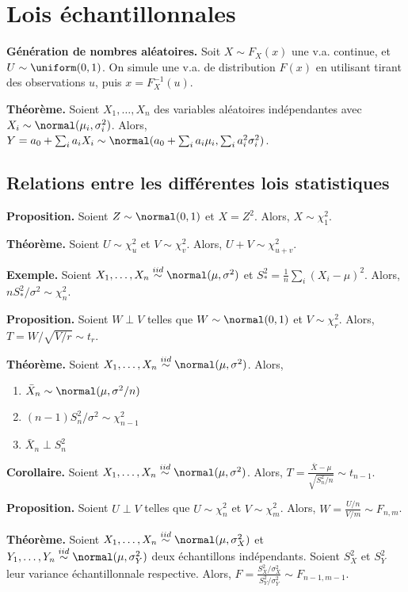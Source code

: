 \section{Lois échantillonnales}
\textbf{Génération de nombres aléatoires.} Soit $X \sim F_X(x)$ une v.a. continue, et $U \sim \uniform(0,1)$. On simule une v.a. de distribution $F(x)$ en utilisant tirant des observations $u$, puis $x=F_X^{-1}(u)$.


\textbf{Théorème.} Soient $X_1, \dots, X_n$ des variables aléatoires indépendantes avec $X_i \sim \normal(\mu_i,\sigma_i^2)$. Alors, $Y = a_0 + \sum_{i} a_iX_i \sim \normal(a_0 + \sum_i a_i\mu_i, \sum_i a_i^2\sigma_i^2)$.

\subsection{Relations entre les différentes lois statistiques}

\textbf{Proposition.} Soient $Z \sim \normal(0,1)$ et $X=Z^2$. Alors, $X \sim \chi^2_1$.

\textbf{Théorème.} Soient $U \sim \chi^2_u$ et $V \sim \chi^2_v$. Alors, $U+V \sim \chi^2_{u+v}$.

\textbf{Exemple.} Soient $X_1, \dots, X_n \overset{iid}{\sim} \normal(\mu, \sigma^2)$ et $S^2_* = \frac{1}{n}\sum_i(X_i-\mu)^2$. Alors, $nS^2_*/\sigma^2 \sim \chi^2_n$.

\textbf{Proposition.} Soient $W \perp V$ telles que $W \sim \normal(0,1)$ et $V \sim \chi^2_r$. Alors, $T=W/\sqrt{V/r} \sim t_r$.

\textbf{Théorème.} Soient $X_1,\dots, X_n \overset{iid}{\sim} \normal(\mu,\sigma^2)$. Alors,
\begin{enumerate}
	\item $\bar{X}_n \sim \normal(\mu, \sigma^2/n)$
	\item $(n-1)S^2_n/\sigma^2 \sim \chi^2_{n-1}$
	\item $\bar{X}_n \perp S^2_n$
\end{enumerate}

\textbf{Corollaire.} Soient $X_1,\dots, X_n \overset{iid}{\sim} \normal(\mu,\sigma^2)$. Alors, $T=\frac{\bar{X}-\mu}{\sqrt{S^2_n/n}} \sim t_{n-1}$.

\textbf{Proposition.} Soient $U \perp V$ telles que $U \sim \chi^2_n$ et $V \sim \chi^2_m$. Alors, $W = \frac{U/n}{V/m} \sim F_{n,m}$.

\textbf{Théorème.} Soient $X_1,\dots, X_n \overset{iid}{\sim} \normal(\mu,\sigma_X^2)$ et $Y_1,\dots, Y_n \overset{iid}{\sim} \normal(\mu,\sigma_Y^2)$ deux échantillons indépendants. Soient $S_X^2$ et $S_Y^2$ leur variance échantillonnale respective. Alors, $F=\frac{S^2_X/\sigma_X^2}{S^2_Y/\sigma_Y^2} \sim F_{n-1,m-1}$.

